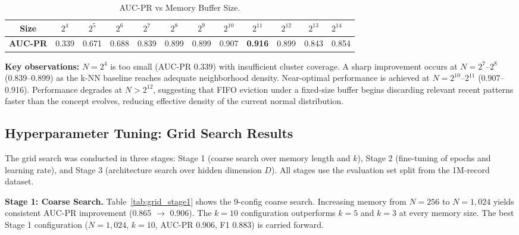 \begin{table}[H]
\centering
\caption{AUC-PR vs Memory Buffer Size.}
\label{tab:memory_buffer_size_ablation}
\begin{tabular}{
  *{11}{c}
}
\toprule
Size & $2^4$ & $2^5$ & $2^6$ & $2^7$ & $2^8$ & $2^9$ & $2^{10}$ & $2^{11}$ & $2^{12}$ & $2^{13}$ & $2^{14}$ \\
\midrule
\textbf{AUC-PR} & 0.339 & 0.671 & 0.688 & 0.839 & 0.899 & 0.899 & 0.907 & \textbf{0.916} & 0.899 & 0.843 & 0.854 \\
\bottomrule
\end{tabular}
\end{table}

\textbf{Key observations:} $N=2^4$ is too small (AUC-PR 0.339) with insufficient cluster coverage. A sharp improvement occurs at $N=2^7$--$2^8$ (0.839--0.899) as the k-NN baseline reaches adequate neighborhood density. Near-optimal performance is achieved at $N=2^{10}$--$2^{11}$ (0.907--0.916). Performance degrades at $N > 2^{12}$, suggesting that FIFO eviction under a fixed-size buffer begins discarding relevant recent patterns faster than the concept evolves, reducing effective density of the current normal distribution.

\subsection{Hyperparameter Tuning: Grid Search Results}

The grid search was conducted in three stages: Stage 1 (coarse search over memory length and $k$), Stage 2 (fine-tuning of epochs and learning rate), and Stage 3 (architecture search over hidden dimension $D$). All stages use the evaluation set split from the 1M-record dataset.

\textbf{Stage 1: Coarse Search.} Table~\ref{tab:grid_stage1} shows the 9-config coarse search. Increasing memory from $N=256$ to $N=1{,}024$ yields consistent AUC-PR improvement (0.865 $\rightarrow$ 0.906). The $k=10$ configuration outperforms $k=5$ and $k=3$ at every memory size. The best Stage 1 configuration ($N=1{,}024$, $k=10$, AUC-PR 0.906, F1 0.883) is carried forward.

